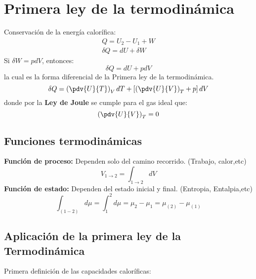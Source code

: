 \documentclass[../main]{subfiles}
\begin{document}
\chapter{Primera ley de la termodinámica}
Conservación de la energía calorífica:
\begin{align}
    Q=U_2-U_1+W \\
    \delta Q=dU+\delta W
\end{align}
Si $\delta W = p dV$, entonces:
\begin{equation}
    \delta Q=dU+pdV
\end{equation}
la cual es la forma diferencial de la Primera ley de la termodinámica.
\begin{equation}
    \delta Q=\left( \pdv{U}{T}\right)_V dT + \left[ \left(\pdv{U}{V}\right)_T+p\right]dV
\end{equation}
donde por la \textbf{Ley de Joule} se cumple para el gas ideal que:
\begin{equation}
    \left(\pdv{U}{V}\right)_T=0
\end{equation}
\section{Funciones termodinámicas}
\textbf{Función de proceso:} Dependen solo del camino recorrido. (Trabajo, calor,etc)
\begin{equation}
    V_{1\rightarrow 2}=\int_{1\rightarrow 2} dV
\end{equation}
\textbf{Función de estado:} Dependen del estado inicial y final. (Entropia, Entalpia,etc)
\begin{equation}
    \int_{(1-2)}d\mu =\int_1^2 d\mu=\mu_2-\mu_1=\mu_{(2)}-\mu_{(1)}
\end{equation}

\section{Aplicación de la primera ley de la Termodinámica}

Primera definición de las capacidades caloríficas:
\end{document}
